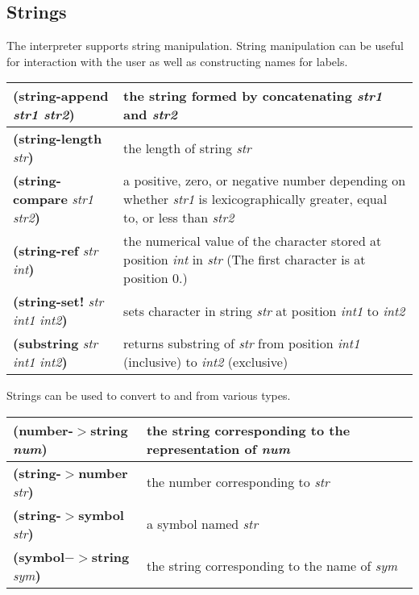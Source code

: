 \documentclass[letterpaper,twoside,12pt]{article}
\begin{document}
\subsection{Strings}

The interpreter supports string manipulation. String manipulation can
be useful for interaction with the user as well as constructing names
for labels.

\begin{center}
   \begin{tabular}{|l|p{}|} \hline
	{\bfseries (string-append }{\itshape str1 str2}{\bfseries )} &
		the string formed by concatenating
		{\itshape str1} and {\itshape str2} \\ \hline
	{\bfseries (string-length }{\itshape str}{\bfseries )} &
		the length of string {\itshape str} \\ \hline
	{\bfseries (string-compare }{\itshape str1 str2}{\bfseries )} &
		a positive, zero, or negative number depending on whether
		{\itshape str1} is lexicographically greater, equal to,
		or less than {\itshape str2} \\ \hline
	{\bfseries (string-ref }{\itshape str int}{\bfseries )} &
		the numerical value of the character stored at position
		{\itshape int} in {\itshape str} (The first character
		is at position 0.) \\ \hline
	{\bfseries (string-set! }{\itshape str int1 int2}{\bfseries )} &
		sets character in string {\itshape str} at position
		{\itshape int1} to {\itshape int2} \\ \hline
	{\bfseries (substring }{\itshape str int1 int2}{\bfseries )} &
		returns substring of {\itshape str} from position
		{\itshape int1} (inclusive) to {\itshape int2} (exclusive) \\ \hline
   \end{tabular}
\end{center}

Strings can be used to convert to and from various types.

\begin{center}
   \begin{tabular}{|l|l|} \hline
	{\bfseries (number-$>$string }{\itshape num}{\bfseries )} &
		the string corresponding to the representation of
		{\itshape num} \\ \hline
	{\bfseries (string-$>$number }{\itshape str}{\bfseries )} &
		the number corresponding to {\itshape str} \\ \hline
	{\bfseries (string-$>$symbol }{\itshape str}{\bfseries )} &
		a symbol named {\itshape str} \\ \hline
	{\bfseries (symbol$->$string }{\itshape sym}{\bfseries )} &
		the string corresponding to the name of {\itshape sym} \\ \hline
   \end{tabular}
\end{center}
\end{document}
